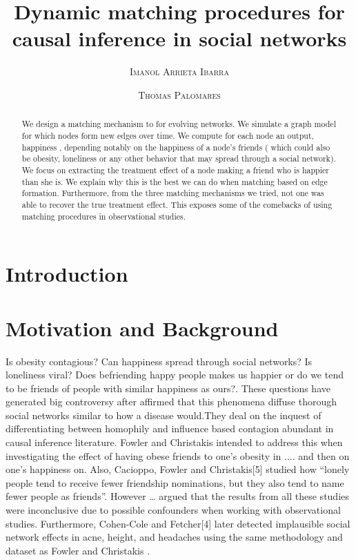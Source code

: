 \documentclass[11pt]{article}
\title{Dynamic matching procedures for causal inference in social networks}
\author{{\textsc{Imanol Arrieta Ibarra}} \\
 \and {\textsc{Thomas Palomares}} \\
}
\begin{document}
\maketitle


\begin{abstract}
We design a matching mechanism to for evolving networks. We simulate a graph model for which nodes form new edges over time. We compute for each node an output, happiness , depending notably on the happiness of a node's friends ( which could also be obesity, loneliness or any other behavior that may spread through a social network). We focus on extracting the treatment effect of a node making a friend who is happier than she is. We explain why this is the best we can do when matching based on edge formation. Furthermore, from the three matching mechanisms we tried, not one was able to recover the true treatment effect. This exposes some of the comebacks of using matching procedures in observational studies. 

\end{abstract}

\newpage

\section{Introduction}




\section{Motivation and Background}

Is obesity contagious? Can happiness spread through social networks? Is loneliness viral? Does befriending happy people makes us happier or do we tend to be friends of people with similar happiness as ours?. These questions have generated big controversy after \cite{christakis2007spread} affirmed that this phenomena diffuse thorough social networks similar to how a disease would.They deal on  the inquest of differentiating between homophily and influence based contagion abundant in causal inference literature. Fowler and Christakis intended to address this when investigating the effect of having obese friends to one’s obesity in .... and then on one’s happiness on. Also,  Cacioppo, Fowler and Christakis[5] studied how “lonely people tend to receive fewer friendship nominations, but they also tend to name fewer people as friends”. However … argued that the results from all these studies were inconclusive due to possible confounders when working with observational studies. Furthermore, Cohen-Cole and Fetcher[4] later detected implausible social network effects in acne, height, and headaches using the same methodology and dataset as Fowler and Christakis . \\
\end{document}
